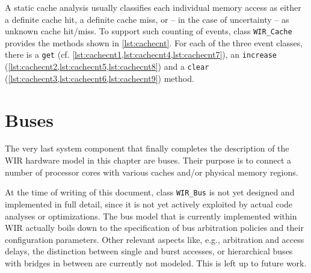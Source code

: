 A static cache analysis usually classifies each individual memory access as either a definite cache hit, a definite cache miss, or -- in the case of uncertainty -- as unknown cache hit/miss.
To support such counting of events, class \texttt{WIR\_Cache} provides the methods shown in \cref{lst:cachecnt}.
For each of the three event classes, there is a \texttt{get} (cf. \cref{lst:cachecnt1,lst:cachecnt4,lst:cachecnt7}), an \texttt{increase} (\cref{lst:cachecnt2,lst:cachecnt5,lst:cachecnt8}) and a \texttt{clear} (\cref{lst:cachecnt3,lst:cachecnt6,lst:cachecnt9}) method.


\section{Buses}
\label{sec:buses}

The very last system component that finally completes the description of the \gls{WIR} hardware model in this chapter are buses.
Their purpose is to connect a number of processor cores with various caches and/or physical memory regions.

\begin{wirFutureWork}
At the time of writing of this document, class \texttt{WIR\_Bus} is not yet designed and implemented in full detail, since it is not yet actively exploited by actual code analyses or optimizations.
The bus model that is currently implemented within \gls{WIR} actually boils down to the specification of bus arbitration policies and their configuration parameters.
Other relevant aspects like, e.g., arbitration and access delays, the distinction between single and burst accesses, or hierarchical buses with bridges in between are currently not modeled.
This is left up to future work.
\end{wirFutureWork}

